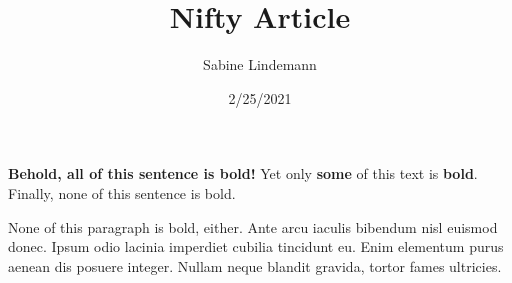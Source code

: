 \documentclass[a4paper]{article}
\title{Nifty Article}
\author{Sabine Lindemann}
\date{2/25/2021}
\begin{document}
\maketitle

\textbf{Behold, all of this sentence is bold!} Yet only \textbf{some} of this text is \textbf{bold}. Finally, none of this sentence is bold.

None of this paragraph is bold, either. Ante arcu iaculis bibendum nisl euismod donec. Ipsum odio lacinia imperdiet cubilia tincidunt eu. Enim elementum purus aenean dis posuere integer. Nullam neque blandit gravida, tortor fames ultricies.
\end{document}
